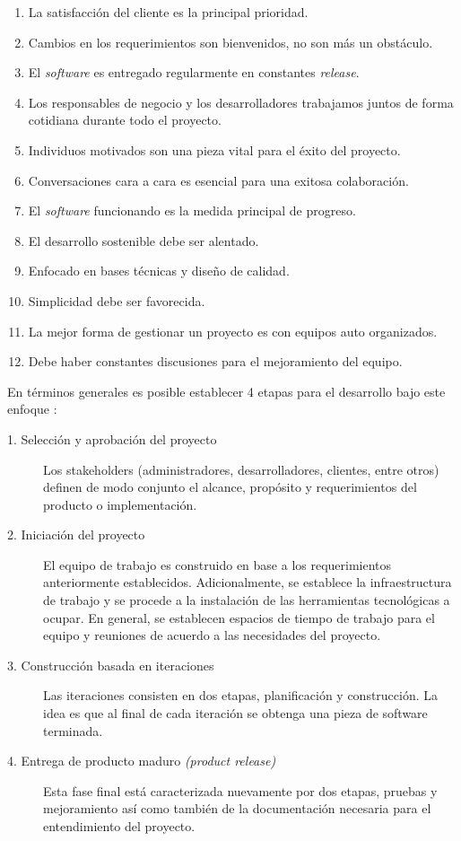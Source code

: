\begin{enumerate}
  \item La satisfacción del cliente es la principal prioridad.
  \item Cambios en los requerimientos son bienvenidos, no son más un obstáculo.
  \item El \textit{software} es entregado regularmente en constantes \textit{release}.
  \item Los responsables de negocio y los desarrolladores trabajamos juntos de forma cotidiana durante todo el proyecto.
  \item Individuos motivados son una pieza vital para el éxito del proyecto.
  \item Conversaciones cara a cara es esencial para una exitosa colaboración.
  \item El \textit{software} funcionando es la medida principal de progreso.
  \item El desarrollo sostenible debe ser alentado.
  \item Enfocado en bases técnicas y diseño de calidad.
  \item Simplicidad debe ser favorecida.
  \item La mejor forma de gestionar un proyecto es con equipos auto organizados.
  \item Debe haber constantes discusiones para el mejoramiento del equipo.
\end{enumerate}

En términos generales es posible establecer 4 etapas para el desarrollo bajo este enfoque  \cite{agile}:

\begin{description}
  \item[1. Selección y aprobación del proyecto] Los stakeholders (administradores, desarrolladores, clientes, entre otros) definen de modo conjunto el alcance, propósito y requerimientos del producto o implementación.
  \item[2. Iniciación del proyecto] El equipo de trabajo es construido en base a los requerimientos anteriormente establecidos. Adicionalmente, se establece la infraestructura de trabajo y se procede a la instalación de las herramientas tecnológicas a ocupar. En general, se establecen espacios de tiempo de trabajo para el equipo y reuniones de acuerdo a las necesidades del proyecto.
  \item[3. Construcción basada en iteraciones] Las iteraciones consisten en dos etapas, planificación y construcción. La idea es que al final de cada iteración se obtenga una pieza de software terminada.
  \item[4. Entrega de producto maduro \textit{(product release)}] Esta fase final está caracterizada nuevamente por dos etapas, pruebas y mejoramiento así como también de la documentación necesaria para el entendimiento del proyecto.
\end{description}

